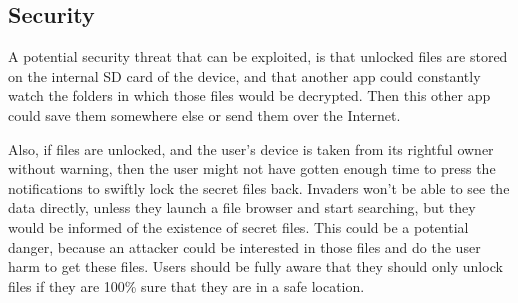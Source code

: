 \subsection{Security}
\label{sec:vulnerability-analysis}
A potential security threat that can be exploited, is that
unlocked files are stored on the internal SD card of the device,
and that another app could constantly watch the folders in which
those files would be decrypted. Then this other app could save
them somewhere else or send them over the Internet.

Also, if files are unlocked, and the user's device is taken from
its rightful owner without warning, then the user might not have
gotten enough time to press the notifications to swiftly lock
the secret files back. Invaders won't be able to see the data
directly, unless they launch a file browser and start searching,
but they would be informed of the existence of secret files.
This could be a potential danger, because an attacker could be
interested in those files and do the user harm to get these
files. Users should be fully aware that they should only unlock
files if they are 100\% sure that they are in a safe location.
